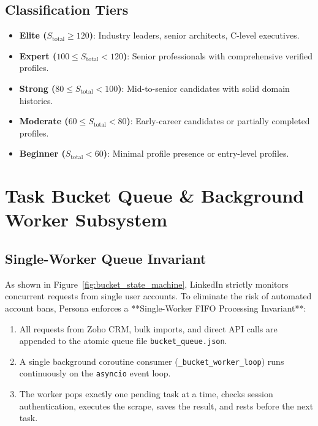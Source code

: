 \documentclass[11pt,a4paper]{report}
\begin{document}
\section{Classification Tiers}
\begin{itemize}[noitemsep, topsep=2pt]
    \item \textbf{Elite ($S_{\text{total}} \ge 120$)}: Industry leaders, senior architects, C-level executives.
    \item \textbf{Expert ($100 \le S_{\text{total}} < 120$)}: Senior professionals with comprehensive verified profiles.
    \item \textbf{Strong ($80 \le S_{\text{total}} < 100$)}: Mid-to-senior candidates with solid domain histories.
    \item \textbf{Moderate ($60 \le S_{\text{total}} < 80$)}: Early-career candidates or partially completed profiles.
    \item \textbf{Beginner ($S_{\text{total}} < 60$)}: Minimal profile presence or entry-level profiles.
\end{itemize}

\chapter{Task Bucket Queue \& Background Worker Subsystem}

\section{Single-Worker Queue Invariant}
As shown in Figure~\ref{fig:bucket_state_machine}, LinkedIn strictly monitors concurrent requests from single user accounts. To eliminate the risk of automated account bans, Persona enforces a **Single-Worker FIFO Processing Invariant**:
\begin{enumerate}[leftmargin=*]
    \item All requests from Zoho CRM, bulk imports, and direct API calls are appended to the atomic queue file \texttt{bucket\_queue.json}.
    \item A single background coroutine consumer (\texttt{\_bucket\_worker\_loop}) runs continuously on the \texttt{asyncio} event loop.
    \item The worker pops exactly one pending task at a time, checks session authentication, executes the scrape, saves the result, and rests before the next task.
\end{enumerate}
\end{document}
